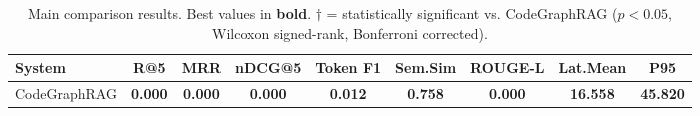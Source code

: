 \begin{table}[t]
\centering
\caption{Main comparison results. Best values in \textbf{bold}. 
$\dagger$ = statistically significant vs. CodeGraphRAG ($p < 0.05$, Wilcoxon signed-rank, Bonferroni corrected).}
\begin{tabular}{lcccccccc}
\toprule
System & R@5 & MRR & nDCG@5 & Token F1 & Sem.Sim & ROUGE-L & Lat.Mean & P95 \\
\midrule
CodeGraphRAG & \textbf{0.000} & \textbf{0.000} & \textbf{0.000} & \textbf{0.012} & \textbf{0.758} & \textbf{0.000} & \textbf{16.558} & \textbf{45.820} \\
\bottomrule
\end{tabular}
\end{table}
